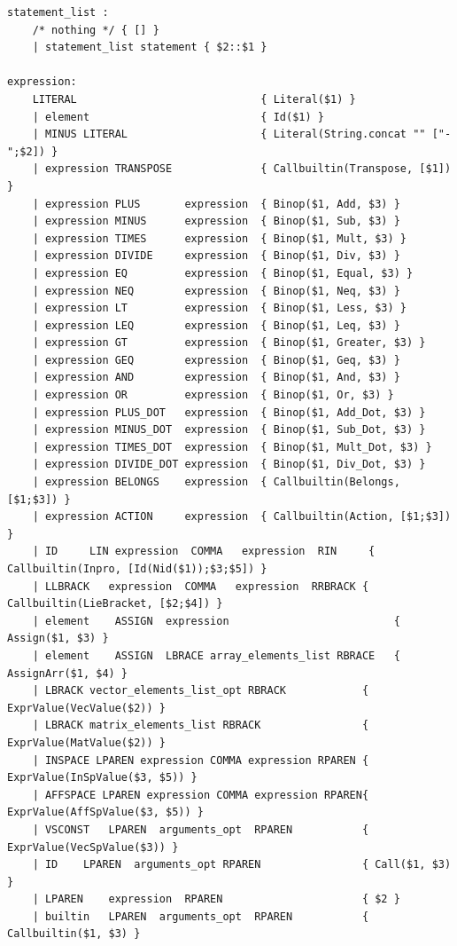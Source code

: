 \documentclass[12pt]{article} %
\begin{document}
\begin{lstlisting}[style=appendix, caption=parser.mly]
statement_list :
    /* nothing */ { [] }
    | statement_list statement { $2::$1 }

expression:
    LITERAL                             { Literal($1) }
    | element                           { Id($1) }
    | MINUS LITERAL                     { Literal(String.concat "" ["-";$2]) }
    | expression TRANSPOSE              { Callbuiltin(Transpose, [$1]) }
    | expression PLUS       expression  { Binop($1, Add, $3) }
    | expression MINUS      expression  { Binop($1, Sub, $3) }
    | expression TIMES      expression  { Binop($1, Mult, $3) }
    | expression DIVIDE     expression  { Binop($1, Div, $3) }
    | expression EQ         expression  { Binop($1, Equal, $3) }
    | expression NEQ        expression  { Binop($1, Neq, $3) }
    | expression LT         expression  { Binop($1, Less, $3) }
    | expression LEQ        expression  { Binop($1, Leq, $3) }
    | expression GT         expression  { Binop($1, Greater, $3) }
    | expression GEQ        expression  { Binop($1, Geq, $3) }
    | expression AND        expression  { Binop($1, And, $3) }
    | expression OR         expression  { Binop($1, Or, $3) }
    | expression PLUS_DOT   expression  { Binop($1, Add_Dot, $3) }
    | expression MINUS_DOT  expression  { Binop($1, Sub_Dot, $3) }
    | expression TIMES_DOT  expression  { Binop($1, Mult_Dot, $3) }
    | expression DIVIDE_DOT expression  { Binop($1, Div_Dot, $3) }
    | expression BELONGS    expression  { Callbuiltin(Belongs, [$1;$3]) }
    | expression ACTION     expression  { Callbuiltin(Action, [$1;$3]) }
    | ID     LIN expression  COMMA   expression  RIN     { Callbuiltin(Inpro, [Id(Nid($1));$3;$5]) }
    | LLBRACK   expression  COMMA   expression  RRBRACK { Callbuiltin(LieBracket, [$2;$4]) }   
    | element    ASSIGN  expression                          { Assign($1, $3) }
    | element    ASSIGN  LBRACE array_elements_list RBRACE   { AssignArr($1, $4) } 
    | LBRACK vector_elements_list_opt RBRACK            { ExprValue(VecValue($2)) }
    | LBRACK matrix_elements_list RBRACK                { ExprValue(MatValue($2)) }
    | INSPACE LPAREN expression COMMA expression RPAREN { ExprValue(InSpValue($3, $5)) }
    | AFFSPACE LPAREN expression COMMA expression RPAREN{ ExprValue(AffSpValue($3, $5)) }  
    | VSCONST   LPAREN  arguments_opt  RPAREN           { ExprValue(VecSpValue($3)) }   
    | ID    LPAREN  arguments_opt RPAREN                { Call($1, $3) } 
    | LPAREN    expression  RPAREN                      { $2 }
    | builtin   LPAREN  arguments_opt  RPAREN           { Callbuiltin($1, $3) }


\end{lstlisting}
\end{document}
